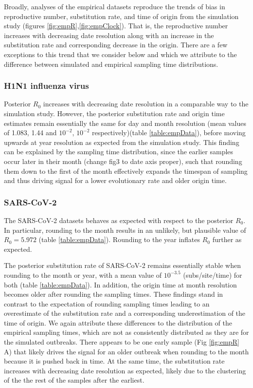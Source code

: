 \documentclass{article}
\begin{document}
\begin{spacing}{1.5}
Broadly, analyses of the empirical datasets reproduce the trends of bias in reproductive number, substitution rate, and time of origin from the simulation study (figures \ref{fig:empR},\ref{fig:empClock}). That is, the reproductive number increases with decreasing date resolution along with an increase in the substitution rate and corresponding decrease in the origin. There are a few exceptions to this trend that we consider below and which we attribute to the difference between simulated and empirical sampling time distributions.

\subsubsection*{H1N1 influenza virus}
Posterior $R_0$ increases with decreasing date resolution in a comparable way to the simulation study. However, the posterior substitution rate and origin time estimates remain essentially the same for day and month resolution (mean values of 1.083, 1.44 and $10^{-2}$, $10^{-2}$ respectively)(table \ref{table:empData}),  before moving upwards at year resolution as expected from the simulation study. This finding can be explained by the sampling time distribution, since the earlier samples occur later in their month (change fig3 to date axis proper), such that rounding them down to the first of the month effectively expands the timespan of sampling and thus driving signal for a lower evolutionary rate and older origin time.

\subsubsection*{SARS-CoV-2}
The SARS-CoV-2 datasets behaves as expected with respect to the posterior $R_0$. In particular, rounding to the month results in an unlikely, but plausible value of $R_0 = 5.972$ (table \ref{table:empData}). Rounding to the year inflates $R_0$ further as expected.

The posterior substitution rate of SARS-CoV-2 remains essentially stable when rounding to the month or year, with a mean value of $10^{-3.5}$ (subs/site/time) for both (table \ref{table:empData}). In addition, the origin time at month resolution becomes older after rounding the sampling times. These findings stand in contrast to the expectation of rounding sampling times leading to an overestimate of the substitution rate and a corresponding underestimation of the time of origin. We again attribute these differences to the distribution of the empirical sampling times, which are not as consistently distributed as they are for the simulated outbreaks. There appears to be one early sample (Fig \ref{fig:empR} A) that likely drives the signal for an older outbreak when rounding to the month because it is pushed back in time. At the same time, the substitution rate increases with decreasing date resolution as expected, likely due to the clustering of the the rest of the samples after the earliest.


\end{spacing}
\end{document}
